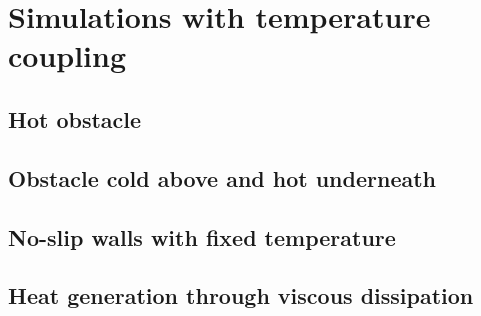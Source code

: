 \documentclass[11 pt]{article}
\begin{document}
%     

%     

%     


\section{Simulations with temperature coupling}

\subsection{Hot obstacle}

\subsection{Obstacle cold above and hot underneath}

\subsection{No-slip walls with fixed temperature}

\subsection{Heat generation through viscous dissipation}

\newpage


% 


\nocite{*}

\end{document}

